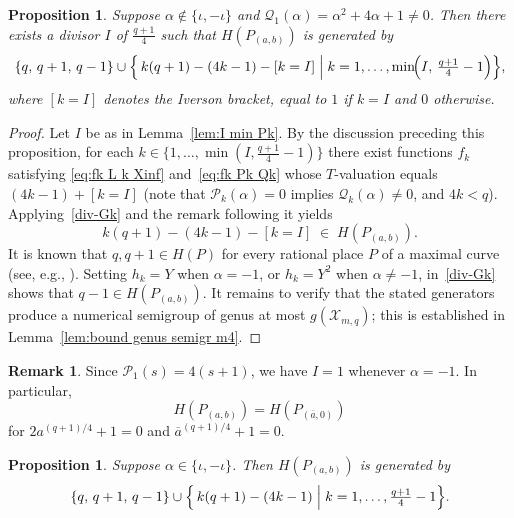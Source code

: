 \documentclass[12pt]{amsart}
\newtheorem{proposition}[theorem]{Proposition}
\theoremstyle{remark}
\theoremstyle{definition}
\newtheorem{remark}[theorem]{Remark}
\begin{document}
\begin{proposition}\label{conj-Yuri-4}
    Suppose $\alpha \notin \{\iota, -\iota\}$ and 
    $\mathcal{Q}_1(\alpha) = \alpha^2 + 4\alpha + 1 \neq 0$. 
    Then there exists a divisor $I$ of $\frac{q+1}{4}$ such that 
    $H(P_{(a,b)})$ is generated by
    \[
        \{q,\, q+1,\, q-1\} \cup 
        \Bigl\{\, k(q+1) - (4k-1) - [k = I] 
        \;\Big|\; k = 1, \ldots, \min\!\Bigl(I,\, \tfrac{q+1}{4} - 1\Bigr) \Bigr\},
    \]
    where $[k = I]$ denotes the Iverson bracket, equal to $1$ if $k = I$ 
    and $0$ otherwise.
\end{proposition}

\begin{proof}
    Let $I$ be as in Lemma~\ref{lem:I min Pk}. By the discussion preceding 
    this proposition, for each 
    $k \in \{1, \ldots, \min(I, \frac{q+1}{4} - 1)\}$ 
    there exist functions $f_k$ satisfying \eqref{eq:fk L k Xinf} 
    and~\eqref{eq:fk Pk Qk} whose $T$-valuation equals 
    $(4k-1) + [k = I]$ (note that $\mathcal{P}_k(\alpha) = 0$ 
    implies $\mathcal{Q}_k(\alpha) \neq 0$, and $4k < q$). 
    Applying~\eqref{div-Gk} and the remark following it yields
    \[
        k(q+1) - (4k-1) - [k=I] \;\in\; H(P_{(a,b)}).
    \]
    It is known that $q, q+1 \in H(P)$ for every rational place $P$ of a 
    maximal curve (see, e.g., \cite[Proposition~1]{FM}). Setting $h_k = Y$ 
    when $\alpha = -1$, or $h_k = Y^2$ when $\alpha \neq -1$, 
    in~\eqref{div-Gk} shows that $q - 1 \in H(P_{(a,b)})$. It remains to 
    verify that the stated generators produce a numerical semigroup of genus 
    at most $g(\mathcal{X}_{m,q})$; this is established in 
    Lemma~\ref{lem:bound genus semigr m4}.
\end{proof}

\begin{remark}\label{rmk:m4}
   \rm{ Since $\mathcal{P}_1(s) = 4(s+1)$, we have $I = 1$ whenever $\alpha = -1$. 
    In particular,
    \[
        H(P_{(a,b)}) = H(P_{(\overline{a},0)})
    \]
    for $2a^{(q+1)/4} + 1 = 0$ and $\overline{a}^{(q+1)/4} + 1 = 0$.}
\end{remark}


\begin{proposition}\label{prop:alpha-iota}
    Suppose $\alpha \in \{\iota, -\iota\}$. Then $H(P_{(a,b)})$ is generated by
    \[
        \{q,\, q+1,\, q-1\} \cup 
        \Bigl\{\, k(q+1) - (4k-1) \;\Big|\; 
        k = 1, \ldots, \tfrac{q+1}{4} - 1 \Bigr\}.
    \]
\end{proposition}
\end{document}
